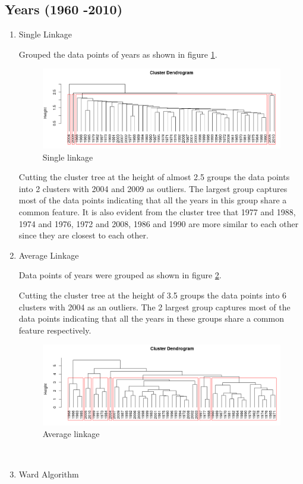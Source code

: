 \documentclass[12pt,a4paper]{article}
\begin{document}
\subsection{Years (1960 -2010)}
\begin{enumerate}[label=\roman*)]

\item Single Linkage

\noindent Grouped the data points of years as shown in figure \ref{fig:s2}.
\begin{figure}[h]
	\centering
	\includegraphics[width=0.7\linewidth]{S2}
	\caption{Single linkage}
	\label{fig:s2}
\end{figure}
Cutting the cluster tree at the height of almost 2.5 groups the data points into 2 clusters with 2004 and 2009 as outliers. The largest group captures most of the data points indicating that all the years in this group share a common feature. It is also evident from the cluster tree that 1977 and 1988, 1974 and 1976, 1972 and 2008, 1986 and 1990 are more similar to each other since they are closest to each other.\\

\item Average Linkage

\noindent Data points of years were grouped as shown in figure \ref{fig:A2}.

Cutting the cluster tree at the height of 3.5 groups the data points into 6 clusters with 2004 as an outliers. The 2 largest group captures most of the data points indicating that all the years in these groups share a common feature respectively.
\begin{figure}[h]
	\centering
	\includegraphics[width=0.7\linewidth]{A2}
	\caption{Average linkage}
	\label{fig:A2}
\end{figure}\\
\item Ward Algorithm


\end{enumerate}
\end{document}
